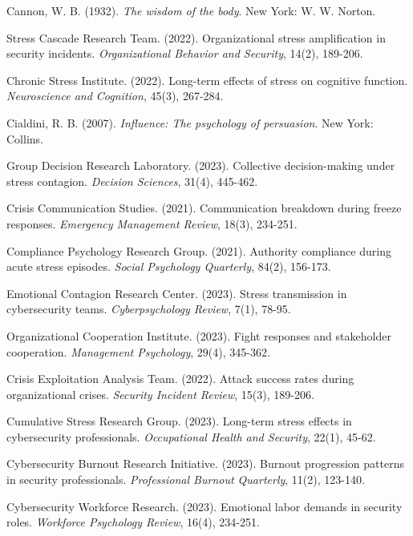 \documentclass[11pt,a4paper]{article}
\begin{document}
\begin{thebibliography}{99}
Cannon, W. B. (1932). \textit{The wisdom of the body}. New York: W. W. Norton.

Stress Cascade Research Team. (2022). Organizational stress amplification in security incidents. \textit{Organizational Behavior and Security}, 14(2), 189-206.

Chronic Stress Institute. (2022). Long-term effects of stress on cognitive function. \textit{Neuroscience and Cognition}, 45(3), 267-284.

Cialdini, R. B. (2007). \textit{Influence: The psychology of persuasion}. New York: Collins.

Group Decision Research Laboratory. (2023). Collective decision-making under stress contagion. \textit{Decision Sciences}, 31(4), 445-462.

Crisis Communication Studies. (2021). Communication breakdown during freeze responses. \textit{Emergency Management Review}, 18(3), 234-251.

Compliance Psychology Research Group. (2021). Authority compliance during acute stress episodes. \textit{Social Psychology Quarterly}, 84(2), 156-173.

Emotional Contagion Research Center. (2023). Stress transmission in cybersecurity teams. \textit{Cyberpsychology Review}, 7(1), 78-95.

Organizational Cooperation Institute. (2023). Fight responses and stakeholder cooperation. \textit{Management Psychology}, 29(4), 345-362.

Crisis Exploitation Analysis Team. (2022). Attack success rates during organizational crises. \textit{Security Incident Review}, 15(3), 189-206.

Cumulative Stress Research Group. (2023). Long-term stress effects in cybersecurity professionals. \textit{Occupational Health and Security}, 22(1), 45-62.

Cybersecurity Burnout Research Initiative. (2023). Burnout progression patterns in security professionals. \textit{Professional Burnout Quarterly}, 11(2), 123-140.

Cybersecurity Workforce Research. (2023). Emotional labor demands in security roles. \textit{Workforce Psychology Review}, 16(4), 234-251.


\end{thebibliography}
\end{document}
